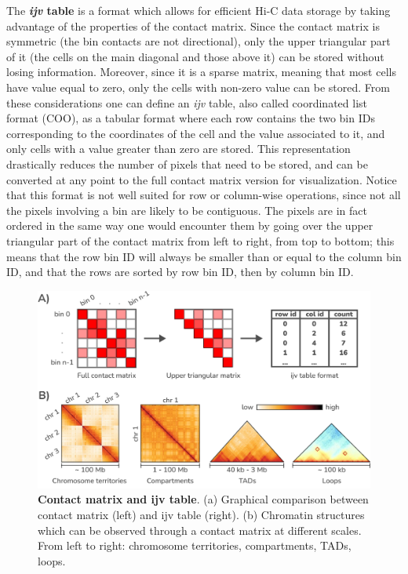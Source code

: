 The \textbf{\emph{ijv} table} is a format which allows for efficient Hi-C data storage by taking advantage of the properties of the contact matrix. Since the contact matrix is symmetric (the bin contacts are not directional), only the upper triangular part of it (the cells on the main diagonal and those above it) can be stored without losing information. Moreover, since it is a sparse matrix, meaning that most cells have value equal to zero, only the cells with non-zero value can be stored. From these considerations one can define an \emph{ijv} table, also called coordinated list format (COO), as a tabular format where each row contains the two bin IDs corresponding to the coordinates of the cell and the value associated to it, and only cells with a value greater than zero are stored. This representation drastically reduces the number of pixels that need to be stored, and can be converted at any point to the full contact matrix version for visualization. Notice that this format is not well suited for row or column-wise operations, since not all the pixels involving a bin are likely to be contiguous. The pixels are in fact ordered in the same way one would encounter them by going over the upper triangular part of the contact matrix from left to right, from top to bottom; this means that the row bin ID will always be smaller than or equal to the column bin ID, and that the rows are sorted by row bin ID, then by column bin ID.

\begin{figure}[ht]
  \centering
  \includegraphics[width=1\textwidth]{contact_matrix.png}
  \caption{\textbf{Contact matrix and ijv table}. (a) Graphical comparison between contact matrix (left) and ijv table (right). (b) Chromatin structures which can be observed through a contact matrix at different scales. From left to right: chromosome territories, compartments, TADs, loops.}
  \label{fig:contacts}
\end{figure}

